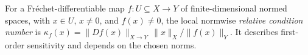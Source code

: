 
For a Fréchet-differentiable map $f:U\subseteq X\to Y$ of finite-dimensional normed spaces, with $x\in U$, $x\ne0$, and $f(x)\ne0$, the local normwise \emph{relative condition number} is $\kappa_f(x)=\|Df(x)\|_{X\to Y}\,\|x\|_X/\|f(x)\|_Y$. It describes first-order sensitivity and depends on the chosen norms.
